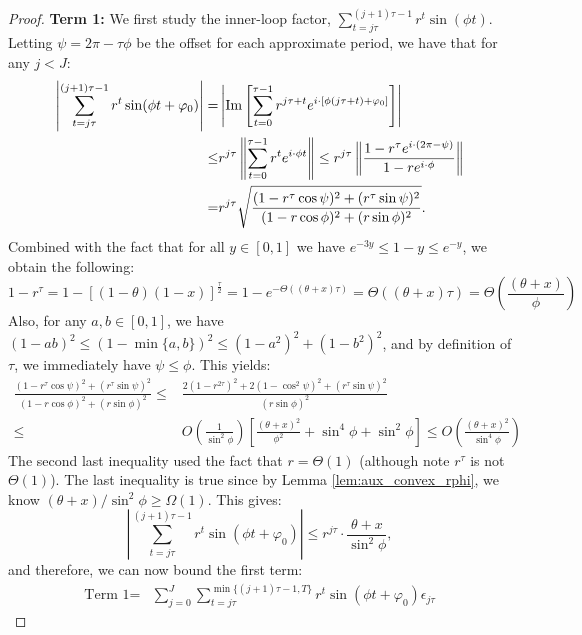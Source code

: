 \begin{proof}
\noindent \textbf{Term 1:} We first study the inner-loop factor, $\sum_{t = j\tau}^{(j+1)\tau-1} r^t \sin(\phi t)$. Letting $\psi = 2\pi - \tau \phi$ be the offset 
for each approximate period, we have that for any $j < J$:
\begin{align*}
\left|\sum_{t = j\tau}^{(j+1)\tau-1} r^t \sin(\phi t+ \varphi_0)\right|
=& \left|\mathrm{Im}\left[\sum_{t = 0}^{\tau-1} r^{j\tau + t} e^{i\cdot [\phi(j\tau + t)+ \varphi_0]}\right]\right|\\
\le& r^{j\tau}\left\|{\sum_{t = 0}^{\tau-1} r^{t} e^{i\cdot \phi t}}\right\|
\le r^{j\tau}\left\|{\frac{1- r^{\tau} e^{i\cdot (2\pi - \psi)}}{1-r e^{i\cdot \phi}}}\right\| \\
=& r^{j\tau} \sqrt{\frac{(1 - r^{\tau}\cos \psi)^2 + (r^{\tau}\sin\psi)^2}
{(1 - r\cos \phi)^2 + (r\sin\phi)^2}}.
\end{align*}
Combined with the fact that for all $y\in[0, 1]$ we have $e^{-3y} \le 1-y \le e^{-y} $, we obtain the following:
\begin{equation}\label{eq:aux_r_tau}
1 - r^{\tau} = 1 - [(1-\theta)(1-x)]^{\frac{\tau}{2}}
= 1 - e^{-\Theta((\theta+x)\tau)} = \Theta ((\theta + x)\tau)
= \Theta \left(\frac{(\theta + x)}{\phi}\right)
\end{equation}
Also, for any $a, b\in [0, 1]$, we have $
(1-ab)^2 \le (1-\min\{a, b\})^2 \le (1-a^2)^2 + (1-b^2)^2$, and by definition of $\tau$, we immediately have $\psi \le \phi$. This yields:
\begin{align*}
\frac{(1 - r^{\tau}\cos \psi)^2 + (r^{\tau}\sin\psi)^2}
{(1 - r\cos \phi)^2 + (r\sin\phi)^2}
\le& \frac{2(1 - r^{2\tau})^2+  2(1-\cos^2 \psi)^2 + (r^{\tau}\sin\psi)^2}
{(r\sin\phi)^2} \\
\le&O\left(\frac{1}{\sin^2 \phi}\right) \left[\frac{(\theta + x)^2}{\phi^2}  +  \sin^4\phi + \sin^2 \phi\right]
\le O\left(\frac{(\theta + x)^2}{\sin^4 \phi}\right)
\end{align*}
The second last inequality used the fact that $r = \Theta(1)$ (although note $r^{\tau}$ is not $\Theta(1)$).
The last inequality is true since by Lemma \ref{lem:aux_convex_rphi}, we know
$(\theta+x)/ \sin^2 \phi \ge \Omega(1)$. This gives:
$$\left|\sum_{t = j\tau}^{(j+1)\tau-1} r^t \sin(\phi t + \varphi_0)\right|
\le r^{j\tau}  \cdot \frac{\theta + x}{\sin^2\phi},$$
and therefore, we can now bound the first term:
\begin{align*}
\text{Term 1} =& \sum_{j=0}^{J} \sum_{t = j\tau}^{\min\{(j+1)\tau-1, T\}} r^t \sin(\phi t+ \varphi_0) \epsilon_{j\tau} 

\end{align*}
\end{proof}
